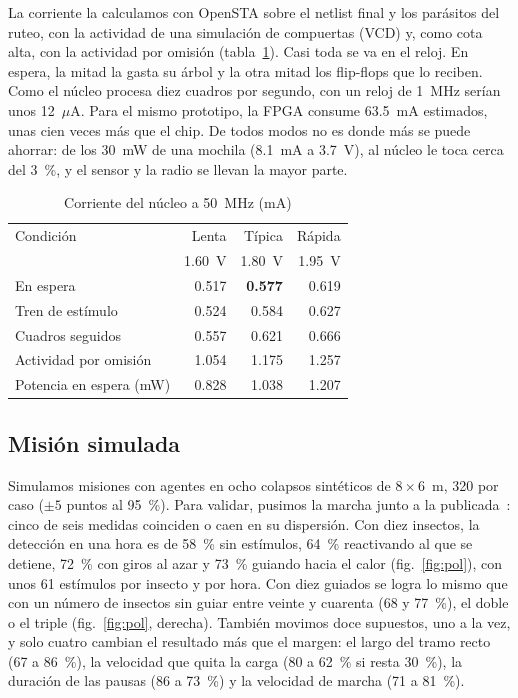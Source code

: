\documentclass[conference,letterpaper,10pt]{IEEEtran}
\newcommand{\tabfont}{\footnotesize}
\begin{document}
La corriente la calculamos con OpenSTA sobre el netlist final y los parásitos del ruteo, con la actividad de una simulación de compuertas
(VCD) y, como cota alta, con la actividad por omisión (tabla~\ref{tab:corr}). Casi toda se va en el reloj. En espera, la mitad la gasta su
árbol y la otra mitad los flip-flops que lo reciben. Como el núcleo procesa diez cuadros por segundo, con un reloj de 1~MHz serían unos
12~$\mu$A. Para el mismo prototipo, la FPGA consume 63.5~mA estimados, unas cien veces más que el chip. De todos modos no es donde más se puede ahorrar: de los 30~mW de una mochila (8.1~mA a 3.7~V), al núcleo le toca cerca del 3~\%, y el
sensor y la radio se llevan la mayor parte.

\begin{table}[!tb]
\centering\tabfont
\caption{Corriente del núcleo a 50~MHz (mA)}
\label{tab:corr}
\begin{tabularx}{\columnwidth}{@{}Xrrr@{}}
\toprule
Condición & Lenta & Típica & Rápida \\
 & 1.60~V & 1.80~V & 1.95~V \\
\midrule
En espera & 0.517 & \textbf{0.577} & 0.619 \\
Tren de estímulo & 0.524 & 0.584 & 0.627 \\
Cuadros seguidos & 0.557 & 0.621 & 0.666 \\
Actividad por omisión & 1.054 & 1.175 & 1.257 \\
Potencia en espera (mW) & 0.828 & 1.038 & 1.207 \\
\bottomrule
\end{tabularx}
\end{table}

\subsection{Misión simulada}

Simulamos misiones con agentes en ocho colapsos sintéticos de $8\times6$~m, 320 por caso ($\pm5$ puntos al 95~\%). Para validar, pusimos la marcha junto a la publicada~\cite{dirafzoon2017,tranngoc2024}: cinco de seis medidas coinciden o caen en su
dispersión.
Con diez insectos, la detección en una hora es de 58~\% sin estímulos, 64~\% reactivando al que se detiene, 72~\% con giros al azar y
73~\% guiando hacia el calor (fig.~\ref{fig:pol}), con unos 61 estímulos por insecto y por hora. Con diez guiados se logra lo mismo que con un número de insectos sin guiar entre veinte y cuarenta (68 y 77~\%), el doble o el triple
(fig.~\ref{fig:pol}, derecha). También movimos doce supuestos, uno a la vez, y solo cuatro cambian el resultado más que el margen: el largo del tramo recto (67
a 86~\%), la velocidad que quita la carga (80 a 62~\% si resta 30~\%), la duración de las pausas (86 a 73~\%) y la velocidad de marcha (71
a 81~\%).
\end{document}
